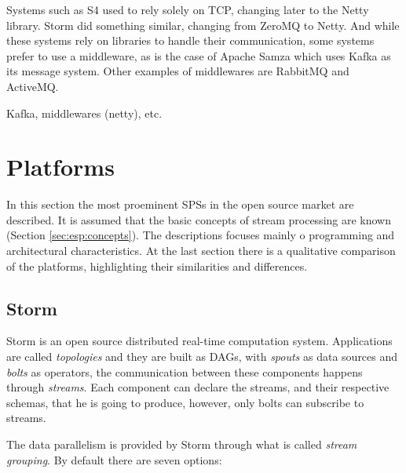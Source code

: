 \documentclass[ppgc,diss,english]{iiufrgs}
\begin{document}
Systems such as S4 used to rely solely on TCP, changing later to the Netty library. Storm did something similar, changing from ZeroMQ to Netty. And while these systems rely on libraries to handle their communication, some systems prefer to use a middleware, as is the case of Apache Samza which uses Kafka as its message system. Other examples of middlewares are RabbitMQ and ActiveMQ.

Kafka, middlewares (netty), etc.

\section{Platforms}
\label{sec:esp:platforms}

In this section the most proeminent SPSs in the open source market are described. It is assumed that the basic concepts of stream processing are known (Section \ref{sec:esp:concepts}). The descriptions focuses mainly o programming and architectural characteristics. At the last section there is a qualitative comparison of the platforms, highlighting their similarities and differences.

\subsection{Storm}

Storm is an open source distributed real-time computation system. Applications are called \emph{topologies} and they are built as DAGs, with \emph{spouts} as data sources and \emph{bolts} as operators, the communication between these components happens through \emph{streams}. Each component can declare the streams, and their respective schemas, that he is going to produce, however, only bolts can subscribe to streams.

The data parallelism is provided by Storm through what is called \emph{stream grouping}. By default there are seven options:
\end{document}
